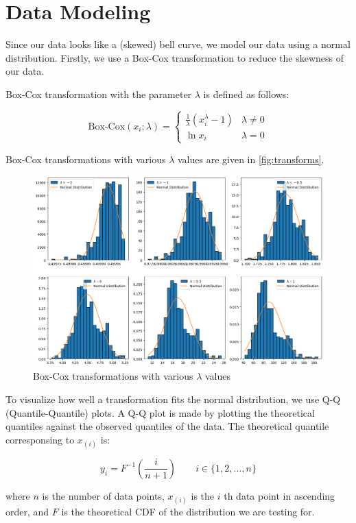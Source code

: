 \section{Data Modeling}

Since our data looks like a (skewed) bell curve, we model our data using a normal distribution.
Firstly, we use a Box-Cox transformation to reduce the skewness of our data.

Box-Cox transformation with the parameter $\lambda$ is defined as follows:

\[
\text{Box-Cox}(x_i; \lambda) =
\begin{cases}
\frac{1}{\lambda} (x_i ^ \lambda - 1) & \lambda \ne 0 \\
\ln x_i & \lambda = 0
\end{cases}
\]

\noindent Box-Cox transformations with various $\lambda$ values are given in \autoref{fig:transforms}.

\begin{figure}[!ht]
  \centering
  \includegraphics[width=\textwidth]{images/transforms.png}
  \caption{Box-Cox transformations with various $\lambda$ values}
  \label{fig:transforms}
\end{figure}

To visualize how well a transformation fits the normal distribution, we use Q-Q (Quantile-Quantile) plots.
A Q-Q plot is made by plotting the theoretical quantiles against the observed quantiles of the data.
The theoretical quantile corresponsing to $x_{(i)}$ is:

\[ y_i = F^{-1}\left(\frac{i}{n + 1}\right) \qquad i \in \{1, 2, ..., n\} \]

\noindent where $n$ is the number of data points, $x_{(i)}$ is the $i$ th data point in ascending order, and $F$ is the theoretical CDF of the distribution we are testing for.


